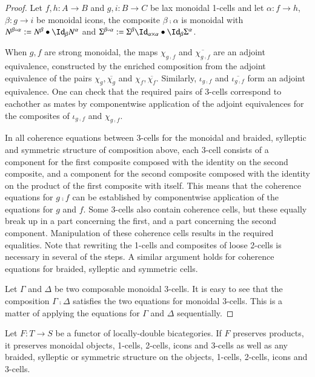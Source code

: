 \begin{proof}
Let $f,h: A \rightarrow B $ and $g,i: B \rightarrow C$ be lax monoidal 1-cells and let $\alpha: f \rightarrow h$, $\beta: g \rightarrow i$ be monoidal icons, the composite $\beta \comp \alpha$ is monoidal with $N^{\beta \comp \alpha}:= N^{\beta} \horc \looseid_{\beta} N^{\alpha}$ and $\Sigma^{\beta \comp \alpha}:= \Sigma^{\beta}\looseid_{\alpha \times \alpha} \horc \looseid_{\beta} \Sigma^{\alpha}$.

When $g,f$ are strong monoidal, the maps $\chi_{g \comp f}$ and $\overline{\chi_{g \comp f}}$ are an adjoint equivalence, constructed by the enriched composition from the adjoint equivalence of the pairs $\chi_g, \overline{\chi_g}$ and $\chi_f, \overline{\chi_f}$. Similarly, $\iota_{g \comp f}$ and $\overline{\iota_{g \comp f}}$ form an adjoint equivalence. One can check that the required pairs of 3-cells correspond to eachother as mates by componentwise application of the adjoint equivalences for the composites of $\iota_{g \comp f}$ and $\chi_{g \comp f}$.

In all coherence equations between 3-cells for the monoidal and braided, sylleptic and symmetric structure of composition above, each 3-cell consists of a component for the first composite  composed with the identity on the second composite, and a component for the second composite composed with the identity on the product of the first composite with itself. This means that the coherence equations for $g \comp f$  can be established by componentwise application of the equations for $g$ and $f$. Some 3-cells also contain coherence cells, but these equally break up in a part concerning the first, and a part concerning the second component. Manipulation of these coherence cells results in the required equalities. Note that rewriting the 1-cells and composites of loose 2-cells is necessary in several of the steps. A similar argument holds for coherence equations for braided, sylleptic and symmetric cells.

Let $\Gamma$ and $\Delta$ be two composable monoidal 3-cells. It is easy to see that the composition $\Gamma \comp \Delta$ satisfies the two equations for monoidal 3-cells. This is a matter of applying the equations for $\Gamma$ and $\Delta$ sequentially.
\end{proof}

 \begin{lem}\label{lem:funcmonob}
Let $F: T \rightarrow S$ be a functor of locally-double bicategories. If $F$ preserves products, it preserves  monoidal objects, 1-cells, 2-cells, icons and 3-cells as well as any braided, sylleptic or symmetric structure on the objects, 1-cells, 2-cells, icons and 3-cells.
 \end{lem}
 

